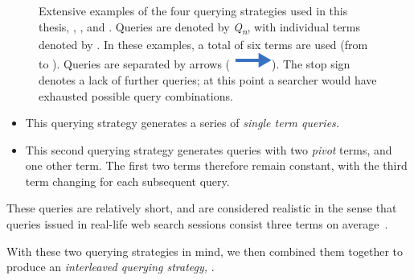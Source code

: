 \begin{figure}[t!]
    \centering
    \caption[Query Strategies example]{Extensive examples of the four querying strategies used in this thesis, , ,  and . Queries are denoted by \emph{Q\textsubscript{n}}, with individual terms denoted by . In these examples, a total of six terms are used (from  to ). Queries are separated by arrows (~\includegraphics[height=\fontcharht\font`\d]{figures/src/arrow-blue-right.pdf}). The stop sign denotes a lack of further queries; at this point a searcher would have exhausted possible query combinations.}
    \label{fig:querying}
\end{figure}

\begin{itemize}
    \item{ This querying strategy generates a series of \emph{single term queries.}}
    \item{ This second querying strategy generates queries with two \emph{pivot} terms, and one other term. The first two terms therefore remain constant, with the third term changing for each subsequent query.}
\end{itemize}

These queries are relatively short, and are considered realistic in the sense that queries issued in real-life web search sessions consist three terms on average~\citep{keskustalo2009querying}.

With these two querying strategies in mind, we then combined them together to produce an \emph{interleaved querying strategy,} .


